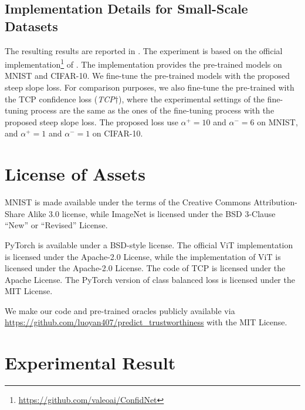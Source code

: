 \subsection{Implementation Details for Small-Scale Datasets}
\label{sec:mnist}
The resulting results are reported in . The experiment is based on the official implementation\footnote{\url{https://github.com/valeoai/ConfidNet}} of \cite{Corbiere_NIPS_2019}. The implementation provides the pre-trained models on MNIST and CIFAR-10.
We fine-tune the pre-trained models with the proposed steep slope loss. For comparison purposes, we also fine-tune the pre-trained with the TCP confidence loss (\ie \textit{TCP$\dagger$}), where the experimental settings of the fine-tuning process are the same as the ones of the fine-tuning process with the proposed steep slope loss. The proposed loss use $\alpha^{+}=10$ and $\alpha^{-}=6$ on MNIST, and $\alpha^{+}=1$ and $\alpha^{-}=1$ on CIFAR-10.

\section{License of Assets}
\label{sec:license}

MNIST \cite{Lecun_IEEE_1998} is made available under the terms of the Creative Commons Attribution-Share Alike 3.0 license, while ImageNet \cite{Deng_CVPR_2009} is licensed under the BSD 3-Clause ``New'' or ``Revised'' License.

PyTorch \cite{Paszke_NIPS_2019} is available under a BSD-style license.
The official ViT \cite{Dosovitskiy_ICLR_2021} implementation is licensed under the Apache-2.0 License, while the implementation of ViT is licensed under the Apache-2.0 License.
The code of TCP \cite{Corbiere_NIPS_2019} is licensed under the Apache License.
The PyTorch version of class balanced loss \cite{Cui_CVPR_2019} is licensed under the MIT License.

We make our code and pre-trained oracles publicly available via \url{https://github.com/luoyan407/predict_trustworthiness} with the MIT License.

% 

\section{Experimental Result}
\label{sec:histogram}

